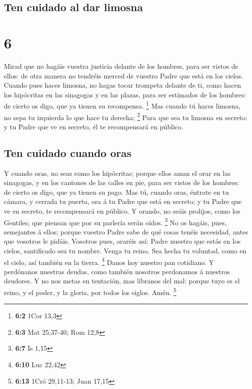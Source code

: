 \hypertarget{ten-cuidado-al-dar-limosna}{%
\subsection{Ten cuidado al dar
limosna}\label{ten-cuidado-al-dar-limosna}}

\hypertarget{section-5}{%
\section{6}\label{section-5}}

 Mirad que no hagáis vuestra justicia delante de los
hombres, para ser vistos de ellos: de otra manera no tendréis merced de
vuestro Padre que está en los cielos.  Cuando pues haces
limosna, no hagas tocar trompeta delante de ti, como hacen los
hipócritas en las sinagogas y en las plazas, para ser estimados de los
hombres: de cierto os digo, que ya tienen su recompensa. \footnote{\textbf{6:2}
  1Cor 13,3}  Mas cuando tú haces limosna, no sepa tu
izquierda lo que hace tu derecha; \footnote{\textbf{6:3} Mat 25,37-40;
  Rom 12,8}  Para que sea tu limosna en secreto: y tu
Padre que ve en secreto, él te recompensará en público.

\hypertarget{ten-cuidado-cuando-oras}{%
\subsection{Ten cuidado cuando oras}\label{ten-cuidado-cuando-oras}}

 Y cuando oras, no seas como los hipócritas; porque ellos
aman el orar en las sinagogas, y en los cantones de las calles en pie,
para ser vistos de los hombres: de cierto os digo, que ya tienen su
pago.  Mas tú, cuando oras, éntrate en tu cámara, y
cerrada tu puerta, ora á tu Padre que está en secreto; y tu Padre que ve
en secreto, te recompensará en público.  Y orando, no
seáis prolijos, como los Gentiles; que piensan que por su parlería serán
oídos. \footnote{\textbf{6:7} Is 1,15}  No os hagáis,
pues, semejantes á ellos; porque vuestro Padre sabe de qué cosas tenéis
necesidad, antes que vosotros le pidáis.  Vosotros pues,
oraréis así: Padre nuestro que estás en los cielos, santificado sea tu
nombre.  Venga tu reino. Sea hecha tu voluntad, como en
el cielo, así también en la tierra. \footnote{\textbf{6:10} Luc 22,42}
 Danos hoy nuestro pan cotidiano.  Y
perdónanos nuestras deudas, como también nosotros perdonamos á nuestros
deudores.  Y no nos metas en tentación, mas líbranos del
mal: porque tuyo es el reino, y el poder, y la gloria, por todos los
siglos. Amén. \footnote{\textbf{6:13} 1Cró 29,11-13; Juan 17,15}

